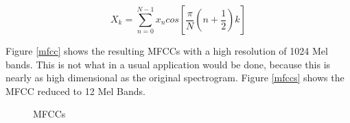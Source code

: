 \begin{equation} \label{eq:dct}
X_k = \sum_{n=0}^{N-1}{x_n cos\left[{\frac{\pi}{N}(n + \frac{1}{2})k}\right]}
\end{equation}

Figure \ref{mfcc} shows the resulting MFCCs with a high resolution of 1024 Mel bands. This is not what in a usual application would be done, because this is nearly as high dimensional as the original spectrogram. Figure \ref{mfccs} shows the MFCC reduced to 12 Mel Bands.


\begin{figure}[htbp]
	\centering
	\caption{MFCCs}	
	\label{fig:mfcc}
\end{figure}
\FloatBarrier

